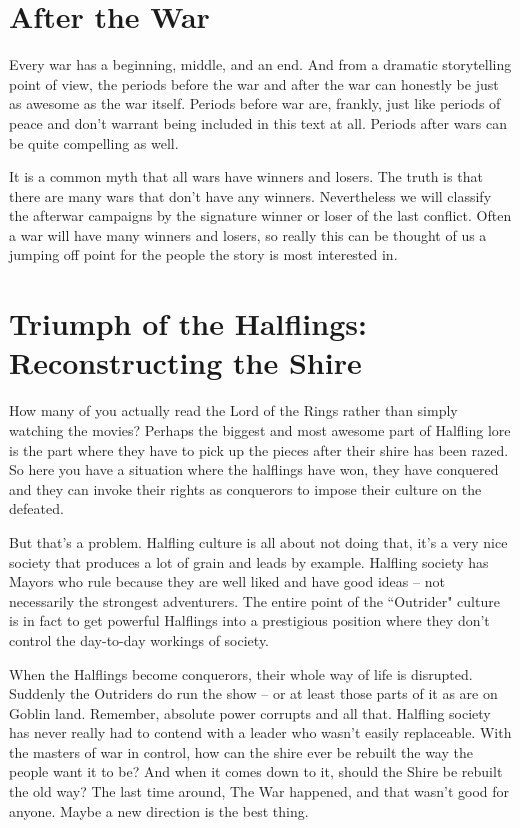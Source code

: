 \section{After the War}
\vspace*{-10pt}

Every war has a beginning, middle, and an end. And from a dramatic storytelling point of view, the periods before the war and after the war can honestly be just as awesome as the war itself. Periods before war are, frankly, just like periods of peace and don't warrant being included in this text at all. Periods after wars can be quite compelling as well.

It is a common myth that all wars have winners and losers. The truth is that there are many wars that don't have any winners. Nevertheless we will classify the afterwar campaigns by the signature winner or loser of the last conflict. Often a war will have many winners and losers, so really this can be thought of us a jumping off point for the people the story is most interested in.

\section{Triumph of the Halflings: Reconstructing the Shire}

How many of you actually read the Lord of the Rings rather than simply watching the movies? Perhaps the biggest and most awesome part of Halfling lore is the part where they have to pick up the pieces after their shire has been razed. So here you have a situation where the halflings have won, they have conquered and they can invoke their rights as conquerors to impose their culture on the defeated.

But that's a problem. Halfling culture is all about not doing that, it's a very nice society that produces a lot of grain and leads by example. Halfling society has Mayors who rule because they are well liked and have good ideas -- not necessarily the strongest adventurers. The entire point of the ``Outrider" culture is in fact to get powerful Halflings into a prestigious position where they don't control the day-to-day workings of society.

When the Halflings become conquerors, their whole way of life is disrupted. Suddenly the Outriders do run the show -- or at least those parts of it as are on Goblin land. Remember, absolute power corrupts and all that. Halfling society has never really had to contend with a leader who wasn't easily replaceable. With the masters of war in control, how can the shire ever be rebuilt the way the people want it to be? And when it comes down to it, should the Shire be rebuilt the old way? The last time around, The War happened, and that wasn't good for anyone. Maybe a new direction is the best thing.


